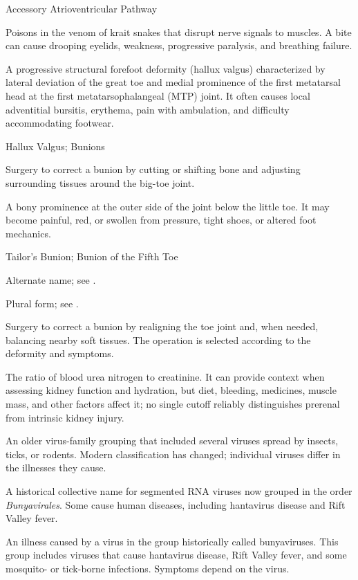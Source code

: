 \synonyms
Accessory Atrioventricular Pathway

 Poisons in the venom of krait snakes that disrupt nerve signals to muscles. A bite can cause drooping eyelids, weakness, progressive paralysis, and breathing failure.

 A progressive structural forefoot deformity (hallux valgus) characterized by lateral deviation of the great toe and medial prominence of the first metatarsal head at the first metatarsophalangeal (MTP) joint. It often causes local adventitial bursitis, erythema, pain with ambulation, and difficulty accommodating footwear.

\synonyms
Hallux Valgus; Bunions

 Surgery to correct a bunion by cutting or shifting bone and adjusting surrounding tissues around the big-toe joint.

 A bony prominence at the outer side of the joint below the little toe. It may become painful, red, or swollen from pressure, tight shoes, or altered foot mechanics.

\synonyms
Tailor's Bunion; Bunion of the Fifth Toe

 Alternate name; see .

 Plural form; see .

 Surgery to correct a bunion by realigning the toe joint and, when needed, balancing nearby soft tissues. The operation is selected according to the deformity and symptoms.

 The ratio of blood urea nitrogen to creatinine. It can provide context when assessing kidney function and hydration, but diet, bleeding, medicines, muscle mass, and other factors affect it; no single cutoff reliably distinguishes prerenal from intrinsic kidney injury.

 An older virus-family grouping that included several viruses spread by insects, ticks, or rodents. Modern classification has changed; individual viruses differ in the illnesses they cause.

 A historical collective name for segmented RNA
viruses now grouped in the order \textit{Bunyavirales}. Some cause human
diseases, including hantavirus disease and Rift Valley fever.

 An illness caused by a virus in the group
historically called bunyaviruses. This group includes viruses that cause
hantavirus disease, Rift Valley fever, and some mosquito- or tick-borne
infections. Symptoms depend on the virus.

